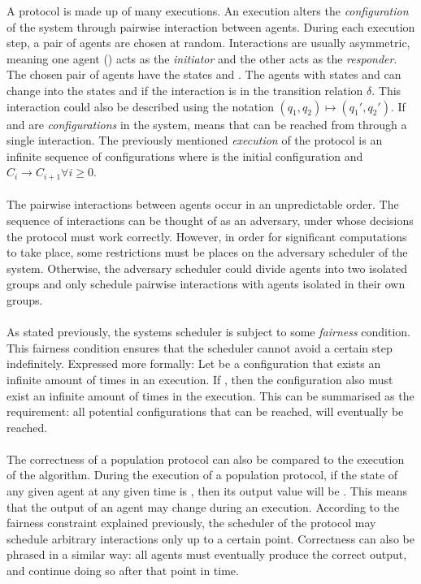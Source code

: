 A protocol is made up of many executions. An execution alters the \emph{configuration} of the system through pairwise interaction between agents. During each execution step, a pair of agents  are chosen at random. Interactions are usually asymmetric, meaning one agent () acts as the \emph{initiator} and the other  acts as the \emph{responder}. The chosen pair of agents have the states  and . The agents with states  and  can change into the states  and  if the interaction  is in the transition relation $\delta$. This interaction could also be described using the notation $(q_1, q_2) \mapsto (q_1', q_2')$.  If  and  are \emph{configurations} in the system,  means that  can be reached from  through a single interaction. The previously mentioned \emph{execution} of the protocol is an infinite sequence of configurations  where  is the initial configuration and $C_i \rightarrow C_{i+1} \forall i \geq 0$. 
\\\\
The pairwise interactions between agents occur in an unpredictable order. The sequence of interactions can be thought of as an adversary, under whose decisions the protocol must work correctly. However, in order for significant computations to take place, some restrictions must be places on the adversary scheduler of the system. Otherwise, the adversary scheduler could divide agents into two isolated groups and only schedule pairwise interactions with agents isolated in their own groups.  
\\\\
As stated previously, the systems scheduler is subject to some \emph{fairness} condition. This fairness condition ensures that the scheduler cannot avoid a certain step indefinitely. Expressed more formally: Let  be a configuration that exists an infinite amount of times in an execution. If , then the configuration  also must exist an infinite amount of times in the execution. This can be summarised as the requirement: all potential configurations that can be reached, will eventually be reached.
\\\\ 
The correctness of a population protocol can also be compared to the execution of the algorithm. During the execution of a population protocol, if the state of any given agent at any given time is , then its output value will be . This means that the output of an agent may change during an execution. According to the fairness constraint explained previously, the scheduler of the protocol may schedule arbitrary interactions only up to a certain point. Correctness can also be phrased in a similar way: all agents must eventually produce the correct output, and continue doing so after that point in time.

